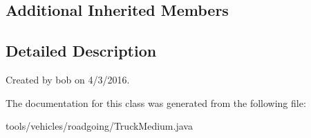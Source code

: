 \subsection*{Additional Inherited Members}


\subsection{Detailed Description}
Created by bob on 4/3/2016. 

The documentation for this class was generated from the following file\+:\begin{DoxyCompactItemize}
\item 
tools/vehicles/roadgoing/Truck\+Medium.\+java\end{DoxyCompactItemize}
